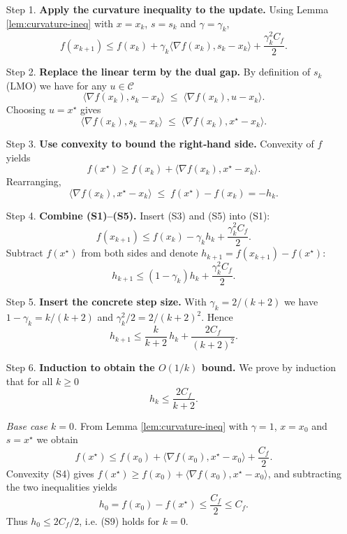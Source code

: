 \documentclass{article}
\newcommand{\Cset}{\mathcal{C}}
\newcommand{\opt}{x^{\star}}
\newcommand{\grad}{\nabla}
\newcommand{\inner}[2]{\langle #1,#2\rangle}
\begin{document}
\begin{enumerate}
\item[Step 1.] \textbf{Apply the curvature inequality to the update.}  
Using Lemma \ref{lem:curvature-ineq} with $x=x_{k}$, $s=s_{k}$ and $\gamma=\gamma_{k}$,
\[
f(x_{k+1})\le f(x_{k})+\gamma_{k}\inner{\grad f(x_{k})}{s_{k}-x_{k}}
+\frac{\gamma_{k}^{2}C_{f}}{2}.
\tag{S1}
\]

\item[Step 2.] \textbf{Replace the linear term by the dual gap.}  
By definition of $s_{k}$ (LMO) we have for any $u\in\Cset$
\[
\inner{\grad f(x_{k})}{s_{k}-x_{k}}\;\le\; \inner{\grad f(x_{k})}{u-x_{k}}.
\tag{S2}
\]
Choosing $u=\opt$ gives
\[
\inner{\grad f(x_{k})}{s_{k}-x_{k}}\;\le\;\inner{\grad f(x_{k})}{\opt-x_{k}}.
\tag{S3}
\]

\item[Step 3.] \textbf{Use convexity to bound the right‑hand side.}  
Convexity of $f$ yields
\[
f(\opt)\ge f(x_{k})+\inner{\grad f(x_{k})}{\opt-x_{k}}.
\tag{S4}
\]
Rearranging,
\[
\inner{\grad f(x_{k})}{\opt-x_{k}}\;\le\; f(\opt)-f(x_{k})=-h_{k}.
\tag{S5}
\]

\item[Step 4.] \textbf{Combine (S1)–(S5).}  
Insert (S3) and (S5) into (S1):
\[
f(x_{k+1})\le f(x_{k})-\gamma_{k}h_{k}+\frac{\gamma_{k}^{2}C_{f}}{2}.
\tag{S6}
\]
Subtract $f(\opt)$ from both sides and denote $h_{k+1}=f(x_{k+1})-f(\opt)$:
\[
h_{k+1}\le (1-\gamma_{k})h_{k}+\frac{\gamma_{k}^{2}C_{f}}{2}.
\tag{S7}
\]

\item[Step 5.] \textbf{Insert the concrete step size.}  
With $\gamma_{k}=2/(k+2)$ we have $1-\gamma_{k}=k/(k+2)$ and $\gamma_{k}^{2}/2=2/(k+2)^{2}$. Hence
\[
h_{k+1}\le \frac{k}{k+2}\,h_{k}+\frac{2C_{f}}{(k+2)^{2}}.
\tag{S8}
\]

\item[Step 6.] \textbf{Induction to obtain the $O(1/k)$ bound.}  
We prove by induction that for all $k\ge0$
\[
h_{k}\le \frac{2C_{f}}{k+2}.
\tag{S9}
\]

\emph{Base case $k=0$.}  
From Lemma \ref{lem:curvature-ineq} with $\gamma=1$, $x=x_{0}$ and $s=\opt$ we obtain
\[
f(\opt)\le f(x_{0})+\inner{\grad f(x_{0})}{\opt-x_{0}}+\frac{C_{f}}{2}.
\]
Convexity (S4) gives $f(\opt)\ge f(x_{0})+\inner{\grad f(x_{0})}{\opt-x_{0}}$, and subtracting the two inequalities yields
\[
h_{0}=f(x_{0})-f(\opt)\le \frac{C_{f}}{2}\le C_{f}.
\]
Thus $h_{0}\le 2C_{f}/2$, i.e. (S9) holds for $k=0$.


\end{enumerate}
\end{document}

